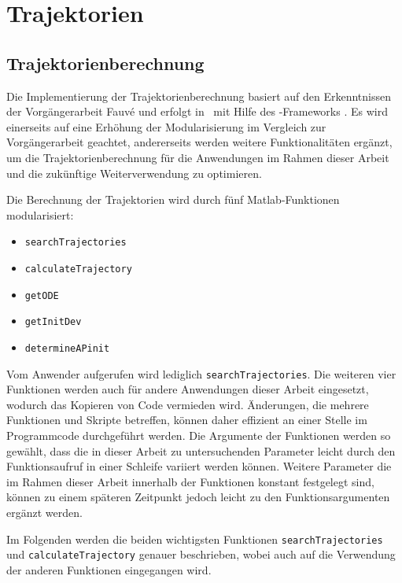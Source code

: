 \chapter{Trajektorien}\label{cha:trj}

\section{Trajektorienberechnung}

Die Implementierung der Trajektorienberechnung basiert auf den Erkenntnissen der Vorgängerarbeit Fauvé \cite{fauve} und erfolgt in \Matlab\ mit Hilfe des \casadi-Frameworks \cite{Andersson2019}. Es wird einerseits auf eine Erhöhung der Modularisierung im Vergleich zur Vorgängerarbeit geachtet, andererseits werden weitere Funktionalitäten ergänzt, um die Trajektorienberechnung für die Anwendungen im Rahmen dieser Arbeit und die zukünftige Weiterverwendung zu optimieren.

Die Berechnung der Trajektorien wird durch fünf Matlab-Funktionen modularisiert:
\begin{itemize}
	\item \texttt{searchTrajectories}
	\item \texttt{calculateTrajectory}
	\item \texttt{getODE}
	\item \texttt{getInitDev}
	\item \texttt{determineAPinit}
\end{itemize}

Vom Anwender aufgerufen wird lediglich \texttt{searchTrajectories}. Die weiteren vier Funktionen werden auch für andere Anwendungen dieser Arbeit eingesetzt, wodurch das Kopieren von Code vermieden wird. Änderungen, die mehrere Funktionen und Skripte betreffen, können daher effizient an einer Stelle im Programmcode durchgeführt werden. Die Argumente der Funktionen werden so gewählt, dass die in dieser Arbeit zu untersuchenden Parameter leicht durch den Funktionsaufruf in einer Schleife variiert werden können. Weitere Parameter die im Rahmen dieser Arbeit innerhalb der Funktionen konstant festgelegt sind, können zu einem späteren Zeitpunkt jedoch leicht zu den Funktionsargumenten ergänzt werden.

Im Folgenden werden die beiden wichtigsten Funktionen \texttt{searchTrajectories} und \texttt{calculateTrajectory} genauer beschrieben, wobei auch auf die Verwendung der anderen Funktionen eingegangen wird.




